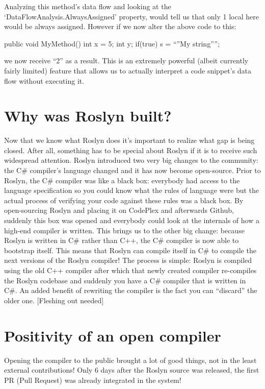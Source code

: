 Analyzing this method’s data flow and looking at the ‘DataFlowAnalysis.AlwaysAssigned’ property, would tell us that only 1 local here would be always assigned. However if we now alter the above code to this:

   public void MyMethod()
   {
      int x = 5;
      int y;
      if(true)
         s = “”My string””;
   }
	
we now receive “2” as a result. This is an extremely powerful (albeit currently fairly limited) feature that allows us to actually interpret a code snippet’s data flow without executing it.


\section{Why was Roslyn built?}
\label{sec:intro-why}

Now that we know what Roslyn does it’s important to realize what gap is being closed. After all, something has to be special about Roslyn if it is to receive such widespread attention.
Roslyn introduced two very big changes to the community: the C\# compiler’s language changed and it has now become open-source. Prior to Roslyn, the C\# compiler was like a black box: everybody had access to the language specification so you could know what the rules of language were but the actual process of verifying your code against these rules was a black box. By open-sourcing Roslyn and placing it on CodePlex and afterwards Github, suddenly this box was opened and everybody could look at the internals of how a high-end compiler is written.
This brings us to the other big change: because Roslyn is written in C\# rather than C++, the C\# compiler is now able to bootstrap itself. This means that Roslyn can compile itself in C\# to compile the next versions of the Roslyn compiler! The process is simple: Roslyn is compiled using the old C++ compiler after which that newly created compiler re-compiles the Roslyn codebase and suddenly you have a C\# compiler that is written in C\#. 
An added benefit of rewriting the compiler is the fact you can “discard” the older one. [Fleshing out needed]

\section{Positivity of an open compiler}
\label{sec:intro-pos-comp}

Opening the compiler to the public brought a lot of good things, not in the least external contributions! Only 6 days after the Roslyn source was released, the first PR (Pull Request) was already integrated in the system!

